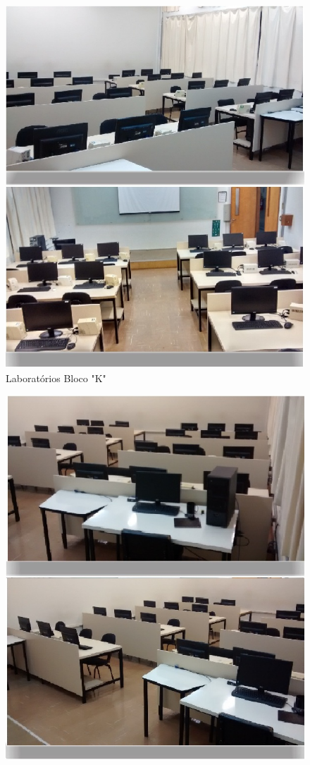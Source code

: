 \documentclass[	DIV=calc,%
paper=a4,%
fontsize=12pt,%
onecolumn]{scrartcl}	 					%
\begin{document}
	\begin{figure}[!h]
		\centering
		\caption{Laboratórios Bloco "K"}
		\includegraphics{laboratorios_1}
	\end{figure}
	\begin{figure}[!h]
		\centering
		\includegraphics{laboratorios_2}
	\end{figure}
\end{document}
